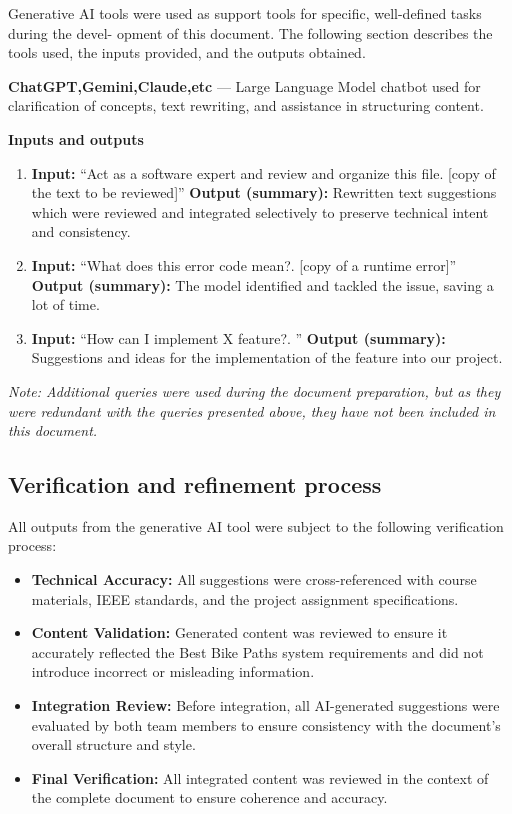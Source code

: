 Generative AI tools were used as support tools for specific, well-defined tasks during the devel-
opment of this document. The following section describes the tools used, the inputs provided,
and the outputs obtained.

\textbf{ChatGPT,Gemini,Claude,etc} --- Large Language Model chatbot used for clarification of concepts, text rewriting, and assistance in structuring content.

\textbf{Inputs and outputs}
\begin{enumerate}
    \item \textbf{Input:} ``Act as a software expert and review and organize this file. [copy of the text to be reviewed]''
     \textbf{Output (summary):} Rewritten text suggestions which were reviewed and integrated selectively to preserve technical intent and consistency. 
    \item \textbf{Input:} ``What does this error code mean?. [copy of a runtime error]''
     \textbf{Output (summary):} The model identified and tackled the issue, saving a lot of time. 
    \item \textbf{Input:} ``How can I implement X feature?. ''
    \textbf{Output (summary):} Suggestions and ideas for the implementation of the feature into our project. 
\end{enumerate}

\textit{Note: Additional queries were used during the document preparation, but as they were redundant with the queries presented above, they have not been included in this document.}

\subsection*{Verification and refinement process}

All outputs from the generative AI tool were subject to the following verification process:
\begin{itemize}
    \item \textbf{Technical Accuracy:} All suggestions were cross-referenced with course materials, IEEE standards, and the project assignment specifications.
    \item \textbf{Content Validation:} Generated content was reviewed to ensure it accurately reflected the Best Bike Paths system requirements and did not introduce incorrect or misleading information.
    \item \textbf{Integration Review:} Before integration, all AI-generated suggestions were evaluated by both team members to ensure consistency with the document's overall structure and style.
    \item \textbf{Final Verification:} All integrated content was reviewed in the context of the complete document to ensure coherence and accuracy.
\end{itemize}


